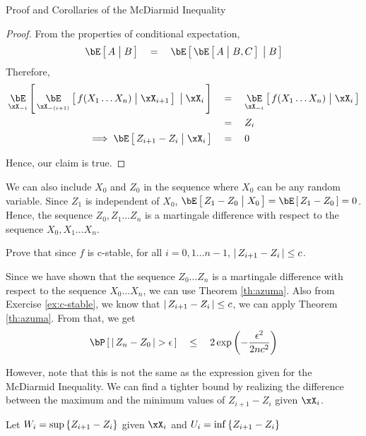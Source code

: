 \documentclass[11pt,a4paper]{article}
\begin{document}
\begin{ssection}{Proof and Corollaries of the McDiarmid Inequality}
\begin{proof}
		From the properties of conditional expectation,
		\begin{align*}
			\E{A \pipe B}	\eq \E{\E{A \pipe B, C} \pipe B} 
		\end{align*}
		Therefore,
		\begin{align*}
			\E[\xX_{-i}]{\E[\xX_{-(i + 1)}]{f(X_1 \dots X_n) \pipe \xX_{i + 1}} \pipe \xX_i} & \eq	\E[\xX_{-i}]{f(X_1 \dots X_n) \pipe \xX_i} \\
			                                                                                 & \eq	Z_i                                        \\
			\implies	\E{Z_{i + 1} - Z_i \pipe \xX_i}                                         & \eq	0                                          
		\end{align*}
		
		Hence, our claim is true.
	\end{proof}
	
	\begin{remark}
		We can also include $X_0$ and $Z_0$ in the sequence where $X_0$ can be any random variable. Since $Z_1$ is independent of $X_0$, $\E{Z_1 - Z_0 \pipe X_0} = \E{Z_1 - Z_0} = 0$. Hence, the sequence $Z_0, Z_1 \dots Z_n$ is a martingale difference with respect to the sequence $X_0, X_1 \dots X_n$.
	\end{remark} \br
	
	\begin{exercise}
		Prove that since $f$ is c-stable, for all $i = 0, 1 \dots n - 1$, $\left| \,{Z_{i + 1} - Z_i}\, \right| \le c$.
		\label{ex:c-stable}
	\end{exercise}
	
	Since we have shown that the sequence $Z_0 \dots Z_n$ is a martingale difference with respect to the sequence $X_0 \dots X_n$, we can use Theorem \ref{th:azuma}. Also from Exercise \ref{ex:c-stable}, we know that $\left| \,{Z_{i + 1} - Z_i}\, \right| \le c$, we can apply Theorem \ref{th:azuma}. From that, we get
	\begin{align*}
		\prob{\abs{Z_n - Z_0} > \epsilon}	\qle	2 \texp{- \frac{\epsilon^2}{2 n c^2}} 
	\end{align*}
	
	However, note that this is not the same as the expression given for the McDiarmid Inequality. We can find a tighter bound by realizing the difference between the maximum and the minimum values of $Z_{i + 1} - Z_{i}$ given $\xX_{i}$.
	
	Let $W_i = \sup \left\{ {Z_{i + 1} - Z_i} \right\}$ given $\xX_i$ and $U_i = \inf \left\{ {Z_{i + 1} - Z_i} \right\}$
	

\end{ssection}
\end{document}
